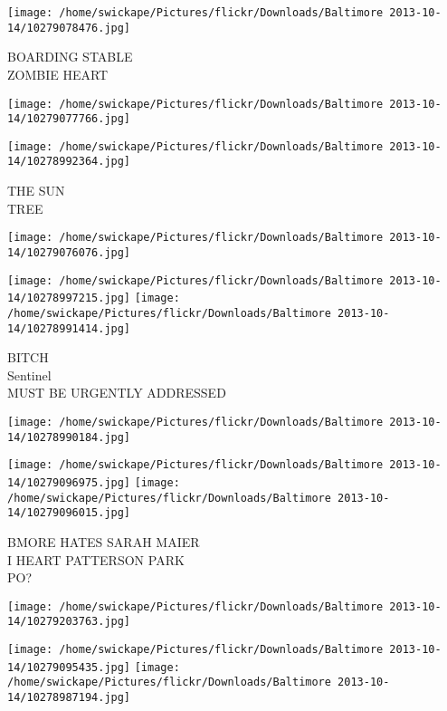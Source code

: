 \documentclass[10pt,letterpaper]{article}
\begin{document}
\vspace{0.25in}
\texttt{[image: /home/swickape/Pictures/flickr/Downloads/Baltimore 2013-10-14/10279078476.jpg]}

BOARDING STABLE\\
ZOMBIE HEART
\pagebreak

\texttt{[image: /home/swickape/Pictures/flickr/Downloads/Baltimore 2013-10-14/10279077766.jpg]}

\vspace{0.25in}
\texttt{[image: /home/swickape/Pictures/flickr/Downloads/Baltimore 2013-10-14/10278992364.jpg]}

THE SUN\\
TREE
\pagebreak

\texttt{[image: /home/swickape/Pictures/flickr/Downloads/Baltimore 2013-10-14/10279076076.jpg]}

\vspace{0.25in}
\texttt{[image: /home/swickape/Pictures/flickr/Downloads/Baltimore 2013-10-14/10278997215.jpg]}
\texttt{[image: /home/swickape/Pictures/flickr/Downloads/Baltimore 2013-10-14/10278991414.jpg]}

BITCH\\
Sentinel\\
MUST BE URGENTLY ADDRESSED
\pagebreak

\texttt{[image: /home/swickape/Pictures/flickr/Downloads/Baltimore 2013-10-14/10278990184.jpg]}

\vspace{0.25in}
\texttt{[image: /home/swickape/Pictures/flickr/Downloads/Baltimore 2013-10-14/10279096975.jpg]}
\texttt{[image: /home/swickape/Pictures/flickr/Downloads/Baltimore 2013-10-14/10279096015.jpg]}

BMORE HATES SARAH MAIER\\
I HEART PATTERSON PARK\\
PO?
\pagebreak

\texttt{[image: /home/swickape/Pictures/flickr/Downloads/Baltimore 2013-10-14/10279203763.jpg]}

\vspace{0.25in}
\texttt{[image: /home/swickape/Pictures/flickr/Downloads/Baltimore 2013-10-14/10279095435.jpg]}
\texttt{[image: /home/swickape/Pictures/flickr/Downloads/Baltimore 2013-10-14/10278987194.jpg]}
\end{document}
